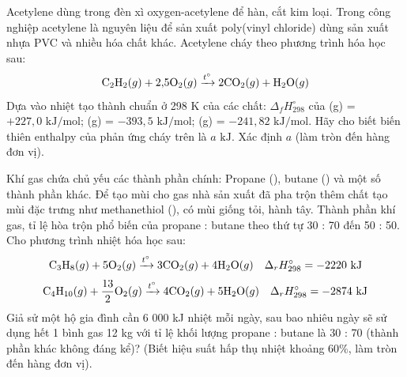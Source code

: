 \documentclass[12pt,a4paper]{article}
\begin{document}
\begin{ex}
Acetylene dùng trong đèn xì oxygen-acetylene để hàn, cắt kim loại. Trong công nghiệp acetylene là nguyên liệu để sản xuất poly(vinyl chloride) dùng sản xuất nhựa PVC và nhiều hóa chất khác. Acetylene cháy theo phương trình hóa học sau:
\[
\ce{C2H2}(g) + 2{,}5\ce{O2}(g) \xrightarrow{t^\circ} 2\ce{CO2}(g) + \ce{H2O}(g)
\]
Dựa vào nhiệt tạo thành chuẩn ở 298 K của các chất: $\Delta_f H^\circ_{298}$ của (g) = $+227{,}0\text{ kJ/mol}$; (g) = $-393{,}5\text{ kJ/mol}$; (g) = $-241{,}82\text{ kJ/mol}$. Hãy cho biết biến thiên enthalpy của phản ứng cháy trên là $a\text{ kJ}$. Xác định $a$ (làm tròn đến hàng đơn vị).
\end{ex}

\begin{ex}
Khí gas chứa chủ yếu các thành phần chính: Propane (), butane () và một số thành phần khác. Để tạo mùi cho gas nhà sản xuất đã pha trộn thêm chất tạo mùi đặc trưng như methanethiol (), có mùi giống tỏi, hành tây. Thành phần khí gas, tỉ lệ hòa trộn phổ biến của propane : butane theo thứ tự 30 : 70 đến 50 : 50.\\
Cho phương trình nhiệt hóa học sau:
\[
\ce{C3H8}(g) + 5\ce{O2}(g) \xrightarrow{t^\circ} 3\ce{CO2}(g) + 4\ce{H2O}(g) \quad \Delta_r H^\circ_{298} = -2220\text{ kJ}
\]
\[
\ce{C4H10}(g) + \frac{13}{2}\ce{O2}(g) \xrightarrow{t^\circ} 4\ce{CO2}(g) + 5\ce{H2O}(g) \quad \Delta_r H^\circ_{298} = -2874\text{ kJ}
\]
Giả sử một hộ gia đình cần 6 000 kJ nhiệt mỗi ngày, sau bao nhiêu ngày sẽ sử dụng hết 1 bình gas 12 kg với tỉ lệ khối lượng propane : butane là 30 : 70 (thành phần khác không đáng kể)? (Biết hiệu suất hấp thụ nhiệt khoảng 60\%, làm tròn đến hàng đơn vị).
\end{ex}
\end{document}
